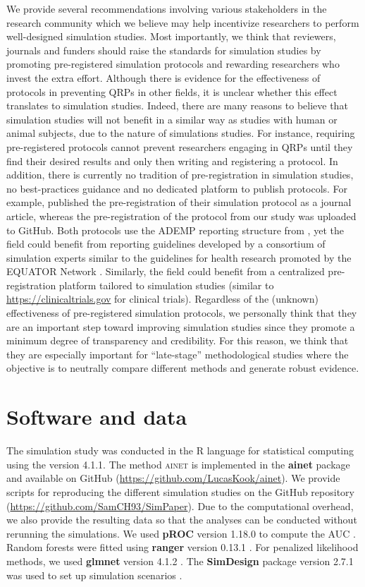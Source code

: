 \documentclass[a4paper, 11pt]{article}
\newcommand{\ainet}{\textsc{ainet}}
\newcommand{\pkg}[1]{\textbf{#1}}
\begin{document}
We provide several recommendations involving various stakeholders in the research
community which we believe may help incentivize researchers to perform well-designed
simulation studies.
Most importantly, we think that reviewers, journals and funders should raise
the standards for simulation studies by promoting pre-registered simulation protocols
and rewarding researchers who invest the extra effort. Although there is evidence for
the effectiveness of protocols in preventing QRPs in other fields, it is unclear
whether this effect translates to simulation studies. Indeed, there are many reasons
to believe that simulation studies will not benefit in a similar way as studies with
human or animal subjects, due to the nature of simulations studies. For instance,
requiring pre-registered protocols cannot prevent researchers engaging in QRPs until
they find their desired results and only then writing and registering a protocol.
In addition, there is currently no tradition of pre-registration in simulation studies,
no best-practices guidance and no dedicated platform to publish protocols. For example,
\citet{Kipruto2022} published the pre-registration of their simulation protocol as a
journal article, whereas the pre-registration of the protocol from our study was uploaded
to GitHub. Both protocols use the ADEMP reporting structure from \citet{Morris2019}, yet
the field could benefit from reporting guidelines
developed by a consortium of simulation experts
similar to the guidelines for health research promoted by the
EQUATOR Network \citep{Altman2008}. Similarly, the field could benefit from a centralized
pre-registration platform tailored to simulation studies (similar to
\url{https://clinicaltrials.gov} for clinical trials).
Regardless of the (unknown) effectiveness of pre-registered simulation protocols,
we personally think that they are an important step toward improving simulation studies
since they promote a minimum degree of transparency and credibility. For this reason, we think
that they are especially important for ``late-stage'' methodological studies
\citep{Heinze2022} where the objective is to neutrally compare different methods and
generate robust evidence.

\section*{Software and data}
The simulation study was conducted in the \textsf{R} language for statistical
computing \citep{pkg:base} using the version 4.1.1. The method
\ainet{} is implemented in the \pkg{ainet} package and available on GitHub
(\url{https://github.com/LucasKook/ainet}). We provide scripts for
reproducing the different simulation studies on the GitHub repository
(\url{https://github.com/SamCH93/SimPaper}).
Due to the computational overhead, we also provide the resulting data
so that the analyses can be conducted without rerunning the simulations.
We used \pkg{pROC} version 1.18.0 to compute the AUC \citep{pkg:proc}.
Random forests were fitted using \pkg{ranger} version 0.13.1 \citep{ranger2017}.
For penalized likelihood methods, we used \pkg{glmnet} version 4.1.2
\citep{Friedman2010,Simon2011}.
The \pkg{SimDesign} package version 2.7.1 was used to set up simulation scenarios
\citep{Chalmers2020}.
\end{document}
